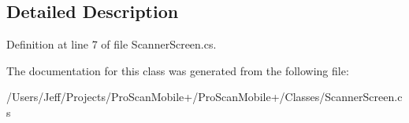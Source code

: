 \subsection{Detailed Description}


Definition at line 7 of file Scanner\-Screen.\-cs.



The documentation for this class was generated from the following file\-:\begin{DoxyCompactItemize}
\item 
/\-Users/\-Jeff/\-Projects/\-Pro\-Scan\-Mobile+/\-Pro\-Scan\-Mobile+/\-Classes/Scanner\-Screen.\-cs\end{DoxyCompactItemize}
